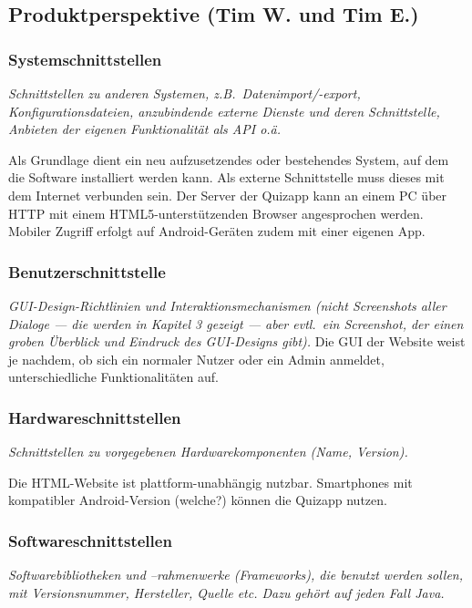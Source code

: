 \documentclass[fontsize=12pt,paper=a4,twoside]{scrartcl}
\begin{document}
\subsection{Produktperspektive (Tim W. und Tim E.)}
  
\subsubsection{Systemschnittstellen}
  {\em Schnittstellen zu anderen Systemen, z.B.\ Datenimport/-export,
  Konfigurationsdateien, anzubindende externe Dienste und deren Schnittstelle,
  Anbieten der eigenen Funktionalität als API o.ä.}
  
Als Grundlage dient ein neu aufzusetzendes oder bestehendes System, auf dem die Software installiert werden kann. Als externe Schnittstelle muss dieses mit dem Internet verbunden sein. Der Server der Quizapp kann an einem PC über HTTP mit einem HTML5-unterstützenden Browser angesprochen werden. Mobiler Zugriff erfolgt auf Android-Geräten zudem mit einer eigenen App.

\subsubsection{Benutzerschnittstelle}

  {\em GUI-Design-Richtlinien und Interaktionsmechanismen (nicht
  Screenshots aller Dialoge --- die werden in Kapitel 3 gezeigt --- aber
  evtl.\ ein Screenshot, der einen groben Überblick und Eindruck des
  GUI-Designs gibt).}
Die GUI der Website weist je nachdem, ob sich ein normaler Nutzer oder ein Admin anmeldet, unterschiedliche Funktionalitäten auf. 

\subsubsection{Hardwareschnittstellen}
  {\em Schnittstellen zu vorgegebenen Hardwarekomponenten (Name,
  Version).}

Die HTML-Website ist plattform-unabhängig nutzbar. Smartphones mit kompatibler Android-Version (welche?) können die Quizapp nutzen.


\subsubsection{Softwareschnittstellen}
{\em Softwarebibliotheken und --rahmenwerke (Frameworks), die benutzt
  werden sollen, mit Versionsnummer, Hersteller, Quelle etc. Dazu
  gehört auf jeden Fall Java.}
\end{document}
